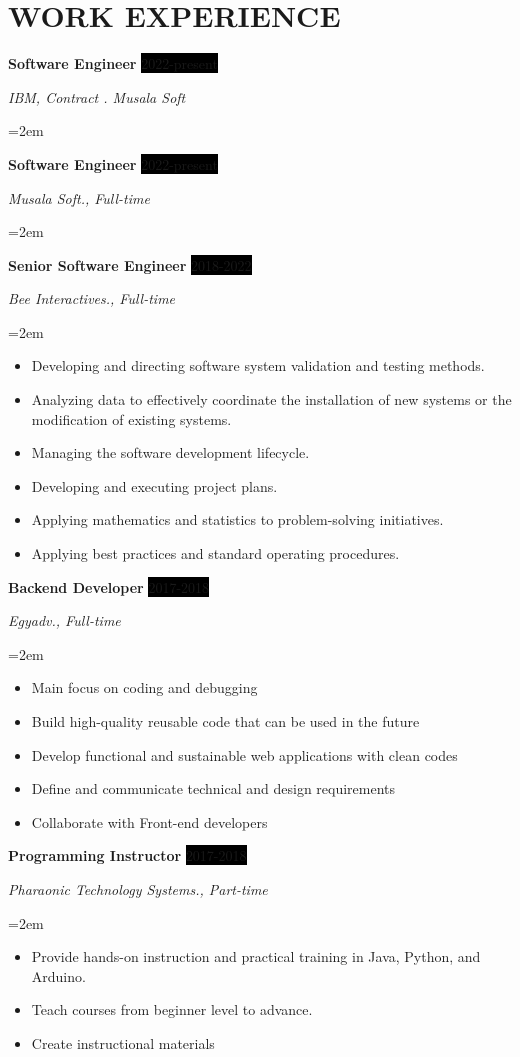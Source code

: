 \documentclass[paper=a4,fontsize=11pt]{scrartcl} %
\newcommand{\sepspace}{\vspace*{1em}}		%
\newcommand{\NewPart}[1]{\section*{\uppercase{#1}}}
\newcommand{\EducationEntry}[4]{
		\noindent \textbf{#1} \hfill      %
		\colorbox{Black}{%
			\parbox{6em}{%
			\hfill\color{White}#2}} \par  %
		\noindent \textit{#3} \par        %
		\noindent\hangindent=2em\hangafter=0 \small #4 %
		\normalsize \par}
\newcommand{\WorkEntry}[4]{				  %
		\noindent \textbf{#1} \hfill      %
		\colorbox{Black}{\color{White}#2} \par  %
		\noindent \textit{#3} \par              %
		\noindent\hangindent=2em\hangafter=0 \small #4 %
		\normalsize \par
		\sepspace}
\begin{document}
\NewPart{Work experience}{

\WorkEntry{Software Engineer}{2022-present}{IBM, Contract . Musala Soft}{
\begin{itemize}
\end{itemize}
}

\WorkEntry{Software Engineer}{2022-present}{Musala Soft., Full-time}{
\begin{itemize}
\end{itemize}
}



\WorkEntry{Senior Software Engineer}{2018-2022}{Bee Interactives., Full-time}{
\begin{itemize}
\item Developing and directing software system validation and testing methods.
\item Analyzing data to effectively coordinate the installation of new systems or the modification of existing systems.
\item Managing the software development lifecycle.
\item Developing and executing project plans.
\item Applying mathematics and statistics to problem-solving initiatives.
\item Applying best practices and standard operating procedures.
\end{itemize}
}


\WorkEntry{Backend Developer}{2017-2018}{Egyadv., Full-time}{
\begin{itemize}
\item Main focus on coding and debugging
\item Build high-quality reusable code that can be used in the future
\item Develop functional and sustainable web applications with clean codes
\item Define and communicate technical and design requirements
\item Collaborate with Front-end developers 
\end{itemize}
}


\WorkEntry{Programming Instructor}{2017-2018}{Pharaonic Technology Systems., Part-time}{
\begin{itemize}
\item Provide hands-on instruction and practical training in Java, Python, and Arduino.
\item Teach courses from beginner level to advance.
\item Create instructional materials
\end{itemize}
}

}
\end{document}
